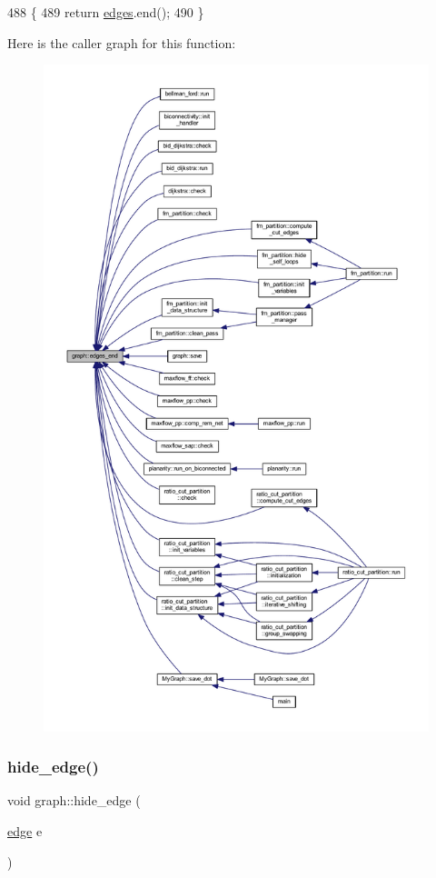 \begin{DoxyCode}
488 \{
489     \textcolor{keywordflow}{return} \mbox{\hyperlink{classgraph_ab5b1c610cca1bcf72b05aacc28a48153}{edges}}.end();
490 \}
\end{DoxyCode}
Here is the caller graph for this function\+:
\nopagebreak
\begin{figure}[H]
\begin{center}
\leavevmode
\includegraphics[height=550pt]{classgraph_aea8d7f976b85b6137f52d915e26639f6_icgraph}
\end{center}
\end{figure}
\mbox{\label{classgraph_ab2f8520bcac080d73c55228fecc61825}} 
\subsubsection{\texorpdfstring{hide\+\_\+edge()}{hide\_edge()}}
{\footnotesize\ttfamily void graph\+::hide\+\_\+edge (\begin{DoxyParamCaption}\item[{\mbox{\hyperlink{classedge}{edge}}}]{e }\end{DoxyParamCaption})}

